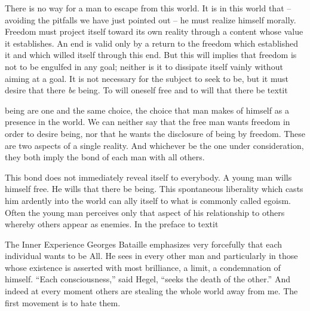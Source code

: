\documentclass[11pt]{article}
\begin{document}
There is no way for a man to escape from this world. It is in this world that – avoiding the pitfalls we have just pointed out – he must realize himself morally. Freedom must project itself toward its own reality through a content whose value it establishes. An end is valid only by a return to the freedom which established it and which willed itself through this end. But this will implies that freedom is not to be engulfed in any goal; neither is it to dissipate itself vainly without aiming at a goal. It is not necessary for the subject to seek to be, but it must desire that there \textit{be} being. To will oneself free and to will that there be textit{{being} are one and the same choice, the choice that man makes of himself as a presence in the world. We can neither say that the free man wants freedom in order to desire being, nor that he wants the disclosure of being by freedom. These are two aspects of a single reality. And whichever be the one under consideration, they both imply the bond of each man with all others.

This bond does not immediately reveal itself to everybody. A young man wills himself free. He wills that there be being. This spontaneous liberality which casts him ardently into the world can ally itself to what is commonly called egoism. Often the young man perceives only that aspect of his relationship to others whereby others appear as enemies. In the preface to textit{{The Inner Experience} Georges Bataille emphasizes very forcefully that each individual wants to be All. He sees in every other man and particularly in those whose existence is asserted with most brilliance, a limit, a condemnation of himself. “Each consciousness,” said Hegel, “seeks the death of the other.” And indeed at every moment others are stealing the whole world away from me. The first movement is to hate them.

}}
\end{document}
